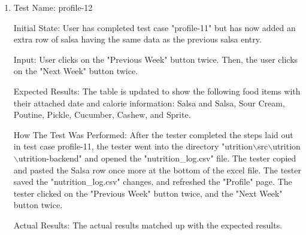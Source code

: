 \documentclass[12pt, titlepage]{article}
\begin{document}
\begin{enumerate}
		\item{Test Name: profile-12}
		
		Initial State:  User has completed test case "profile-11" but has now added an extra row of salsa having the same data as the previous salsa entry.
		
		Input: User clicks on the "Previous Week" button twice. Then, the user clicks on the "Next Week" button twice.
		
		Expected Results: The table is updated to show the following food items with their attached date and calorie information: Salsa and Salsa, Sour Cream, Poutine, Pickle, Cucumber, Cashew, and Sprite.
		
		How The Test Was Performed: After the tester completed the steps laid out in test case profile-11, the tester went into the directory "utrition$\backslash$src$\backslash$utrition$\backslash$utrition-backend" and opened the "nutrition\_log.csv" file. The tester copied and pasted the Salsa row once more at the bottom of the excel file. The tester saved the "nutrition\_log.csv" changes, and refreshed the "Profile" page. The tester clicked on the "Previous Week" button twice, and the "Next Week" button twice.
		
		Actual Results: The actual results matched up with the expected results.
		
	\end{enumerate}
\end{document}
